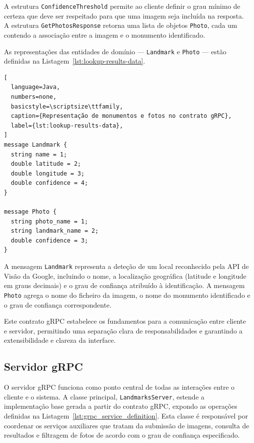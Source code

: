A estrutura \texttt{ConfidenceThreshold} permite ao cliente definir o grau
mínimo de certeza que deve ser respeitado para que uma imagem seja incluída na
resposta. A estrutura \texttt{GetPhotosResponse} retorna uma lista de objetos
\texttt{Photo}, cada um contendo a associação entre a imagem e o monumento
identificado.

As representações das entidades de domínio — \texttt{Landmark} e \texttt{Photo}
— estão definidas na Listagem~\ref{lst:lookup-results-data}.

\begin{center}
  \begin{lstlisting}[
  language=Java,
  numbers=none,
  basicstyle=\scriptsize\ttfamily,
  caption={Representação de monumentos e fotos no contrato gRPC},
  label={lst:lookup-results-data},
]
message Landmark {
  string name = 1;
  double latitude = 2;
  double longitude = 3;
  double confidence = 4;
}

message Photo {
  string photo_name = 1;
  string landmark_name = 2;
  double confidence = 3;
}
\end{lstlisting}
\end{center}

A mensagem \texttt{Landmark} representa a deteção de um local reconhecido pela
API de Visão da Google, incluindo o nome, a localização geográfica (latitude e
longitude em graus decimais) e o grau de confiança atribuído à identificação. A
mensagem \texttt{Photo} agrega o nome do ficheiro da imagem, o nome do
monumento identificado e o grau de confiança correspondente.

Este contrato gRPC estabelece os fundamentos para a comunicação entre cliente e
servidor, permitindo uma separação clara de responsabilidades e garantindo a
extensibilidade e clareza da interface.

\subsection{Servidor gRPC}
\label{ssec:grpc_server}

O servidor gRPC funciona como ponto central de todas as interações entre o
cliente e o sistema. A classe principal, \texttt{LandmarksServer}, estende a
implementação base gerada a partir do contrato gRPC, expondo as operações
definidas na Listagem~\ref{lst:grpc_service_definition}. Esta classe é
responsável por coordenar os serviços auxiliares que tratam da submissão de
imagens, consulta de resultados e filtragem de fotos de acordo com o grau de
confiança especificado.

